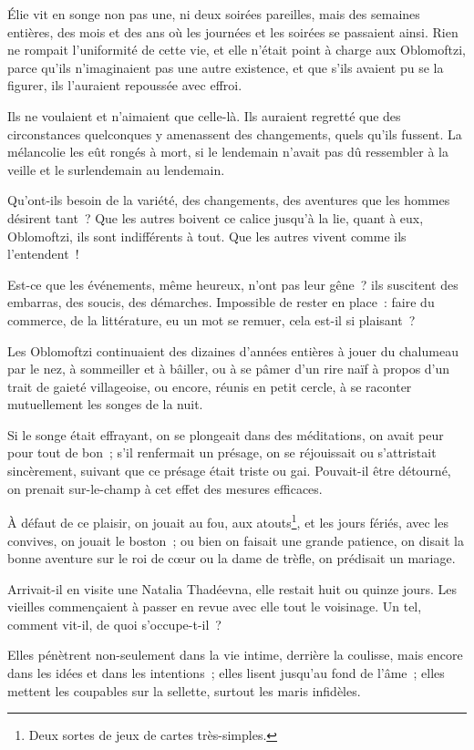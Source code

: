 \documentclass[french,twoside]{book} %
\begin{document}
\noindent Élie vit en songe non pas une, ni deux soirées pareilles, mais des semaines entières, des mois et des ans où les journées et les soirées se passaient ainsi. Rien ne rompait l’uniformité de cette vie, et elle n’était point à charge aux Oblomoftzi, parce qu’ils n’imaginaient pas une autre existence, et que s’ils avaient pu se la figurer, ils l’auraient repoussée avec effroi.\par
Ils ne voulaient et n’aimaient que celle-là. Ils auraient regretté que des circonstances quelconques y amenassent des changements, quels qu’ils fussent. La mélancolie les eût rongés à mort, si le lendemain n’avait pas dû ressembler à la veille et le surlendemain au lendemain.\par
Qu’ont-ils besoin de la variété, des changements, des aventures que les hommes désirent tant ? Que les autres boivent ce calice jusqu’à la lie, quant à eux, Oblomoftzi, ils sont indifférents à tout. Que les autres vivent comme ils l’entendent !\par
Est-ce que les événements, même heureux, n’ont pas leur gêne ? ils suscitent des embarras, des soucis, des démarches. Impossible de rester en place : faire du commerce, de la littérature, eu un mot se remuer, cela est-il si plaisant ?\par
Les Oblomoftzi continuaient des dizaines d’années entières à jouer du chalumeau par le nez, à sommeiller et à bâiller, ou à se pâmer d’un rire naïf à propos d’un trait de gaieté villageoise, ou encore, réunis en petit cercle, à se raconter mutuellement les songes de la nuit.\par
Si le songe était effrayant, on se plongeait dans des méditations, on avait peur pour tout de bon ; s’il renfermait un présage, on se réjouissait ou s’attristait sincèrement, suivant que ce présage était triste ou gai. Pouvait-il être détourné, on prenait sur-le-champ à cet effet des mesures efficaces.\par
À défaut de ce plaisir, on jouait au fou, aux atouts\footnote{Deux sortes de jeux de cartes très-simples.}, et les jours fériés, avec les convives, on jouait le boston ; ou bien on faisait une grande patience, on disait la bonne aventure sur le roi de cœur ou la dame de trèfle, on prédisait un mariage.\par
Arrivait-il en visite une Natalia Thadéevna, elle restait huit ou quinze jours. Les vieilles commençaient à passer en revue avec elle tout le voisinage. Un tel, comment vit-il, de quoi s’occupe-t-il ?\par
Elles pénètrent non-seulement dans la vie intime, derrière la coulisse, mais encore dans les idées et dans les intentions ; elles lisent jusqu’au fond de l’âme ; elles mettent les coupables sur la sellette, surtout les maris infidèles.\par
\end{document}
